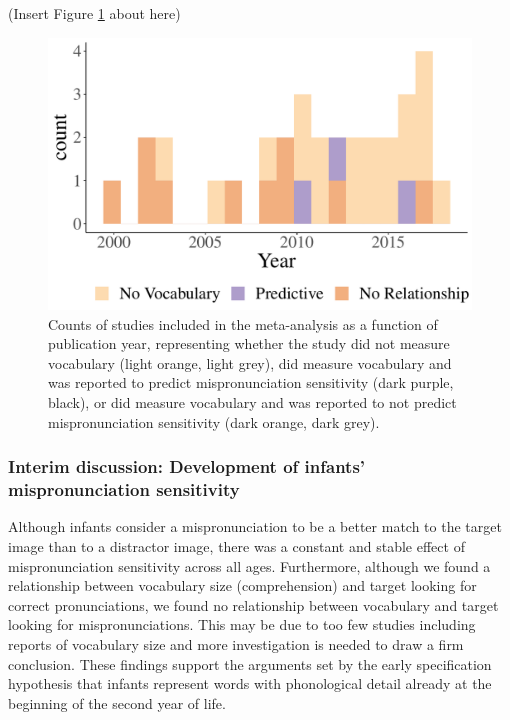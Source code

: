 \documentclass[
  english,
  man, noextraspace]{apa6}
\begin{document}
(Insert Figure \ref{fig:Vocabdescribe1} about here)

\begin{figure}
\centering
\includegraphics{VonHolzenBergmann_MPMetaAnalysis_files/figure-latex/Vocabdescribe1-1.pdf}
\caption{\label{fig:Vocabdescribe1}Counts of studies included in the meta-analysis as a function of publication year, representing whether the study did not measure vocabulary (light orange, light grey), did measure vocabulary and was reported to predict mispronunciation sensitivity (dark purple, black), or did measure vocabulary and was reported to not predict mispronunciation sensitivity (dark orange, dark grey).}
\end{figure}

\hypertarget{interim-discussion-development-of-infants-mispronunciation-sensitivity}{%
\subsubsection{Interim discussion: Development of infants' mispronunciation sensitivity}\label{interim-discussion-development-of-infants-mispronunciation-sensitivity}}

Although infants consider a mispronunciation to be a better match to the target image than to a distractor image, there was a constant and stable effect of mispronunciation sensitivity across all ages. Furthermore, although we found a relationship between vocabulary size (comprehension) and target looking for correct pronunciations, we found no relationship between vocabulary and target looking for mispronunciations. This may be due to too few studies including reports of vocabulary size and more investigation is needed to draw a firm conclusion. These findings support the arguments set by the early specification hypothesis that infants represent words with phonological detail already at the beginning of the second year of life.
\end{document}
